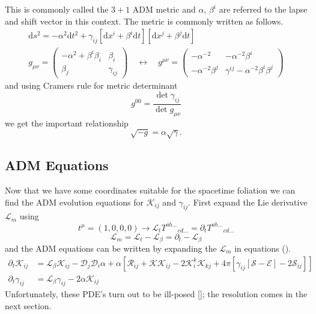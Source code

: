 \documentclass[11pt, oneside]{report}  %
\newcommand{\D}{\mathcal{D}}
\newcommand{\E}{\mathcal{E}}
\renewcommand{\S}{\mathcal{S}}
\newcommand{\K}{\mathcal{K}}
\renewcommand{\L}{\mathcal{L}}
\newcommand{\R}{\mathcal{R}}
\newcommand{\dd}{\mathrm{d}}
\numberwithin{equation}{section}
\begin{document}
This is commonly called the $3+1$ ADM metric and $\alpha$, $\beta^i$ are referred to the lapse and shift vector in this context. The metric is commonly written as follows.
\begin{gather}\dd s^2 = -\alpha^2 \dd t^2 + \gamma_{ij}\left[\dd x^i + \beta^i \dd t\right]\left[\dd x^j + \beta^j \dd t\right]\\
 g_{\mu\nu} = \begin{pmatrix} -\alpha^2 + \beta^i \beta_i & \beta_i \\ \beta_j & \gamma_{ij} \end{pmatrix}\quad \leftrightarrow\quad g^{\mu\nu} = \begin{pmatrix} -\alpha^{-2}  & -\alpha^{-2} \beta^i \\ -\alpha^{-2}\beta^j & \gamma^{ij} - \alpha^{-2}\beta^i \beta^j \end{pmatrix}\end{gather}
and using Cramers rule for metric determinant
\begin{equation} g^{00} = \frac{\det{\gamma_{ij}}}{\det{g_{\mu\nu}}}\end{equation}
we get the important relationship
\begin{equation} \sqrt{-g} = \alpha \sqrt{\gamma} .\end{equation}

\subsection{ADM Equations}
Now that we have some coordinates suitable for the spacetime foliation we can find the ADM evolution equations for $\K_{ij}$ and $\gamma_{ij}$. First expand the Lie derivative $\L_m$ using
\begin{equation} t^{\mu} = (1,0,0,0) \rightarrow \L_t {{T}}^{ab ...}_{\;\;\;\;\;\;\;cd ...} = \partial_t {{T}}^{ab ...}_{\;\;\;\;\;\;\;cd ...}\end{equation}
\begin{equation} \L_m = \L_{t} - \L_\beta  = \partial_t - \L_\beta\end{equation}
and the ADM equations can be written by expanding the $\L_m$ in equations (). 
\begin{align} \partial_t \K_{ij} &= \L_\beta \K_{ij}  -\D_j\D_i \alpha + \alpha \left[ \R_{ij} + \K\K_{ij} - 2\K^k_i\K_{kj} + 4\pi \left[ \gamma_{ij}\left[ \S-\E\right]-2\S_{ij}\right]\right]\\
\partial_t \gamma_{ij} &= \L_\beta \gamma_{ij} - 2\alpha\K_{ij}\end{align}
Unfortunately, these PDE's turn out to be ill-posed []; the resolution comes in the next section.
\end{document}
